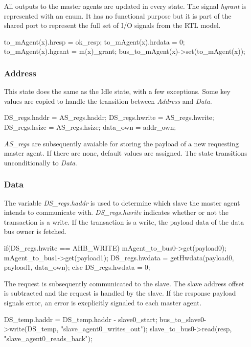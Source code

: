 All outputs to the master agents are updated in every state.
The signal \textit{hgrant} is represented with an enum. It has no functional purpose but it is part of the shared port to represent the full set of I/O signals from the RTL model. 
\begin{C++}
to_mAgent(x).hresp = ok_resp; 
to_mAgent(x).hrdata = 0; 
to_mAgent(x).hgrant = m(x)_grant;
bus_to_mAgent(x)->set(to_mAgent(x)); 
\end{C++}

		
\subsubsection{Address}
This state does the same as the Idle state, with a few exceptions. Some key values are copied to handle the transition between \textit{Address} and \textit{Data}.

\begin{C++}
DS_regs.haddr = AS_regs.haddr; 
DS_regs.hwrite = AS_regs.hwrite; 
DS_regs.hsize = AS_regs.hsize; 
data_own = addr_own;
\end{C++}

\textit{AS\_regs} are subsequently avaiable for storing the payload of a new requesting master agent. If there are none, default values are assigned. The state transitions unconditionally to \textit{Data}.

\subsubsection{Data}
The variable \textit{DS\_regs.haddr} is used to determine which slave the master agent intends to communicate with. \textit{DS\_regs.hwrite} indicates whether or not the transaction is a write. If the transaction is a write, the payload data of the data bus owner is fetched.
\begin{C++}
if(DS_regs.hwrite == AHB_WRITE){
mAgent_to_bus0->get(payload0);
mAgent_to_bus1->get(payload1);
DS_regs.hwdata = getHwdata(payload0, payload1, data_own);
}else{
DS_regs.hwdata = 0;
}
\end{C++}  

The request is subsequently communicated to the slave. The slave address offset is subtracted and the request is handled by the slave. If the response payload signals error, an error is excplicitly signaled to each master agent.
\begin{C++}
DS_temp.haddr = DS_temp.haddr - slave0_start;
bus_to_slave0->write(DS_temp, "slave_agent0_writes_out");
slave_to_bus0->read(resp, "slave_agent0_reads_back");
\end{C++} 

